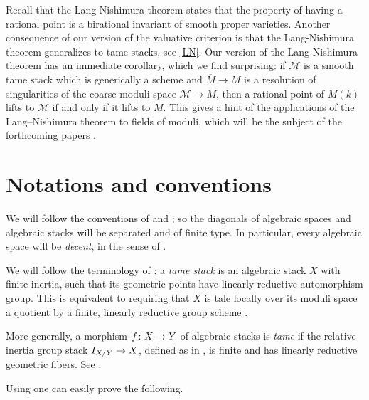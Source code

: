 \documentclass{amsart}
\numberwithin{equation}{section}
\numberwithin{subsection}{section}
\theoremstyle{definition}
\theoremstyle{remark}
\renewcommand{\mathcal}{\mathscr}
\newcommand\cM{\mathcal{M}} \newcommand\cN{\mathcal{N}}
\newcommand\arr{\ifinner\to\else\longrightarrow\fi}
\begin{document}
Recall that the Lang-Nishimura theorem states that the property of having a rational point is a birational invariant of smooth proper varieties. Another consequence of our version of the valuative criterion is that the Lang-Nishimura theorem generalizes to tame stacks, see \ref{LN}. Our version of the Lang-Nishimura theorem has an immediate corollary, which we find surprising: if $\cM$ is a smooth tame stack which is generically a scheme and $\overline{M}\to M$ is a resolution of singularities of the coarse moduli space $\cM\to M$, then a rational point of $M(k)$ lifts to $\cM$ if and only if it lifts to $\overline{M}$. This gives a hint of the applications of the Lang--Nishimura theorem to fields of moduli, which will be the subject of the forthcoming papers \cite{giulio-angelo-fields-moduli, giulio-singularities}.


\section{Notations and conventions}


We will follow the conventions of \cite{knutson} and \cite{laumon-moret-bailly}; so the diagonals of algebraic spaces and algebraic stacks will be separated and of finite type. In particular, every algebraic space will be \emph{decent}, in the sense of \cite[Definition~03I8]{stacks-project}.

We will follow the terminology of \cite{dan-olsson-vistoli1}: a \emph{tame stack} is an algebraic stack $X$ with finite inertia, such that its geometric points have linearly reductive automorphism group. This is equivalent to requiring that $X$ is tale locally over its moduli space a quotient by a finite, linearly reductive group scheme \cite[Theorem 3.2]{dan-olsson-vistoli1}.

More generally, a morphism $f\colon X \arr Y$ of algebraic stacks is \emph{tame} if the relative inertia group stack $I_{X/Y} \arr X$, defined as in \cite[\href{https://stacks.math.columbia.edu/tag/050P}{Section 050P}]{stacks-project}, is finite and has linearly reductive geometric fibers. See \cite[\S 3]{dan-olsson-vistoli-2}.

Using \cite[\href{https://stacks.math.columbia.edu/tag/0CPK}{Lemma 0CPK}]{stacks-project} one can easily prove the following.
\end{document}

